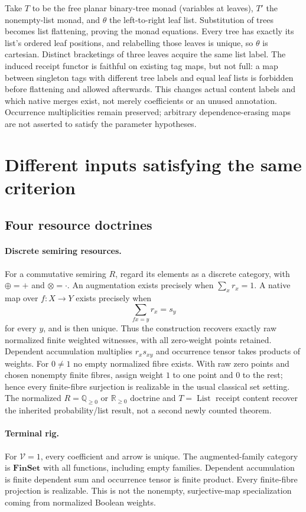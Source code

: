 \documentclass[11pt,a4paper]{article}
\theoremstyle{definition}
\newcommand{\V}{\mathcal V}
\newcommand{\List}{\operatorname{List}}
\newcommand{\FinSet}{\mathbf{FinSet}}
\begin{document}
Take $T$ to be the free planar binary-tree monad (variables at leaves), $T'$ the
nonempty-list monad, and $\theta$ the left-to-right leaf list. Substitution of
trees becomes list flattening, proving the monad equations. Every tree has
exactly its list's ordered leaf positions, and relabelling those leaves is
unique, so $\theta$ is cartesian. Distinct bracketings of three leaves acquire
the same list label. The induced receipt functor is faithful on existing tag
maps, but not full: a map between singleton tags with different tree labels
and equal leaf lists is forbidden before flattening and allowed afterwards.
This changes actual content labels and which native merges exist, not merely
coefficients or an unused annotation. Occurrence multiplicities remain
preserved; arbitrary dependence-erasing maps are not asserted to satisfy the
parameter hypotheses.

\section{Different inputs satisfying the same criterion}\label{sec:instances}

\subsection{Four resource doctrines}
\paragraph{Discrete semiring resources.}
For a commutative semiring $R$, regard its elements as a discrete category,
with $\oplus=+$ and $\otimes=\cdot$. An augmentation exists precisely when
$\sum_xr_x=1$. A native map over $f:X\to Y$ exists precisely when
\[
 \sum_{fx=y}r_x=s_y
\]
for every $y$, and is then unique. Thus the construction recovers exactly raw
normalized finite weighted witnesses, with all zero-weight points retained.
Dependent accumulation multiplies $r_xs_{xy}$ and occurrence tensor takes
products of weights. For $0\ne1$ no empty normalized fibre exists. With raw
zero points and chosen nonempty finite fibres, assign weight $1$ to one point
and $0$ to the rest; hence every finite-fibre surjection is realizable in the
usual classical set setting. The normalized $R=\mathbb Q_{\ge0}$ or
$\mathbb R_{\ge0}$ doctrine and $T=\List$ receipt content recover the
inherited probability/list result, not a second newly counted theorem.

\paragraph{Terminal rig.}
For $\V=1$, every coefficient and arrow is unique. The augmented-family
category is $\FinSet$ with all functions, including empty families. Dependent
accumulation is finite dependent sum and occurrence tensor is finite product.
Every finite-fibre projection is realizable. This is not the nonempty,
surjective-map specialization coming from normalized Boolean weights.
\end{document}
